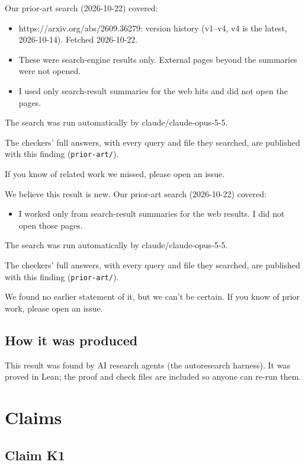 \documentclass{article}
\begin{document}
Our prior-art search (2026-10-22) covered:

\begin{itemize}
\item https://arxiv.org/abs/2609.36279: version history (v1--v4, v4 is the latest, 2026-10-14). Fetched 2026-10-22.
\item These were search-engine results only. External pages beyond the summaries were not opened.
\item I used only search-result summaries for the web hits and did not open the pages.
\end{itemize}

The search was run automatically by claude/claude-opus-5-5.

The checkers' full answers, with every query and file they searched, are published with this finding (\texttt{prior-art/}).

If you know of related work we missed, please open an issue.

We believe this result is new. Our prior-art search (2026-10-22) covered:

\begin{itemize}
\item I worked only from search-result summaries for the web results. I did not open those pages.
\end{itemize}

The search was run automatically by claude/claude-opus-5-5.

The checkers' full answers, with every query and file they searched, are published with this finding (\texttt{prior-art/}).

We found no earlier statement of it, but we can't be certain. If you know of prior work, please open an issue.

\subsection*{How it was produced}

This result was found by AI research agents (the autoresearch harness). It was proved in Lean; the proof and check files are included so anyone can re-run them.

\section{Claims}

\subsection*{Claim K1}
\end{document}
